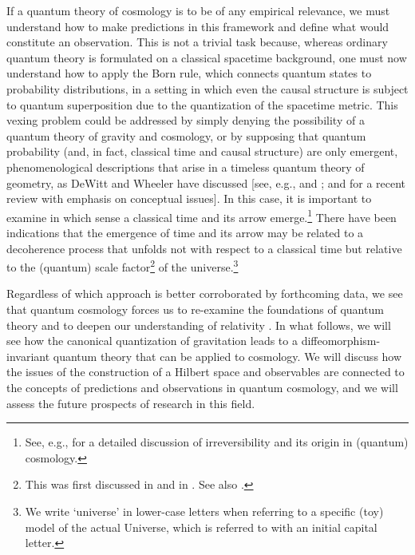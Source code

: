 \documentclass[12pt]{iopart}
\begin{document}
If a quantum theory of cosmology is to be of any empirical relevance, we must understand how to make predictions in this framework and define what would constitute an observation. This is not a trivial task because, whereas ordinary quantum theory is formulated on a classical spacetime background, one must now understand how to apply the Born rule, which connects quantum states to probability distributions, in a setting in which even the causal structure is subject to quantum superposition due to the quantization of the spacetime metric. This vexing problem could be addressed by simply denying the possibility of a quantum theory of gravity and cosmology, or by supposing that quantum probability (and, in fact, classical time and causal structure) are only emergent, phenomenological descriptions that arise in a timeless quantum theory of geometry, as DeWitt and Wheeler have discussed [see, e.g., \citet{DeWitt:1967yk} and \citet{Wheeler:1968iap}; and \citet{Kiefer:2021zdq} for a recent review with emphasis on conceptual issues]. In this case, it is important to examine in which sense a classical time and its arrow emerge.\footnote{See, e.g., \citet{Zeh1989-ZEHTPB} for a detailed discussion of irreversibility and its origin in (quantum) cosmology.} There have been indications that the emergence of time and its arrow may be related to a decoherence process that unfolds not with respect to a classical time but relative to the (quantum) scale factor\footnote{This was first discussed in \citet{Zeh:1986ix} and in \citet{Kiefer:1987ft}. See also \citet{Giulini:1996nw}.} of the universe.\footnote{We write `universe' in lower-case letters when referring to a specific (toy) model of the actual Universe, which is referred to with an initial capital letter.}

Regardless of which approach is better corroborated by forthcoming data, we see that quantum cosmology forces us to re-examine the foundations of quantum theory and to deepen our understanding of relativity \citep{Bojowald:2010cj}. In what follows, we will see how the canonical quantization of gravitation leads to a diffeomorphism-invariant quantum theory that can be applied to cosmology. We will discuss how the issues of the construction of a Hilbert space and observables are connected to the concepts of predictions and observations in quantum cosmology, and we will assess the future prospects of research in this field.
\end{document}
